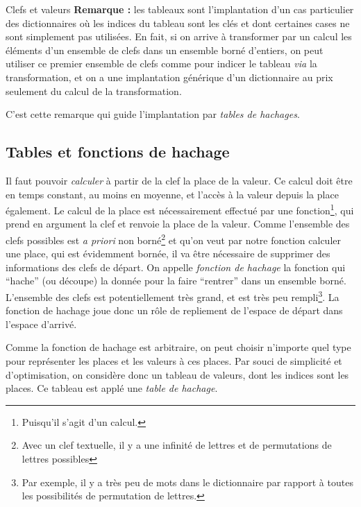 \documentclass[../../../main.tex]{subfiles}
\begin{document}
\begin{definition}{Clefs et valeurs}
\textbf{Remarque :} les tableaux sont l'implantation d'un cas particulier des dictionnaires où les indices du tableau sont les clés et dont certaines cases ne sont simplement pas utilisées. En fait, si on arrive à transformer par un calcul les éléments d'un ensemble de clefs dans un ensemble borné d'entiers, on peut utiliser ce premier ensemble de clefs comme pour indicer le tableau \textit{via} la transformation, et on a une implantation générique d'un dictionnaire au prix seulement du calcul de la transformation.

C'est cette remarque qui guide l'implantation par \textit{tables de hachages}. 
\subsection{Tables et fonctions de hachage}
Il faut pouvoir \textit{calculer} à partir de la clef la place de la valeur. Ce calcul doit être en temps constant, au moins en moyenne, et l'accès à la valeur depuis la place également. Le calcul de la place est nécessairement effectué par une fonction\footnote{Puisqu'il s'agit d'un calcul.}, qui prend en argument la clef et renvoie la place de la valeur. Comme l'ensemble des clefs possibles est \textit{a priori} non borné\footnote{Avec un clef textuelle, il y a une infinité de lettres et de permutations de lettres possibles} et qu'on veut par notre fonction calculer une place, qui est évidemment bornée, il va être nécessaire de supprimer des informations des clefs de départ. On appelle \textit{fonction de hachage} la fonction qui ``hache'' (ou découpe) la donnée pour la faire ``rentrer'' dans un ensemble borné. L'ensemble  des clefs est potentiellement très grand, et est très peu rempli\footnote{Par exemple, il y a très peu de mots dans le dictionnaire par rapport à toutes les possibilités de permutation de lettres.}. La fonction de hachage joue donc un rôle de repliement de l'espace de départ dans l'espace d'arrivé.

Comme la fonction de hachage est arbitraire, on peut choisir n'importe quel type pour représenter les places et les valeurs à ces places. Par souci de simplicité et d'optimisation, on considère donc un tableau de valeurs, dont les indices sont les places. Ce tableau est applé une \textit{table de hachage}.


\end{definition}
\end{document}
